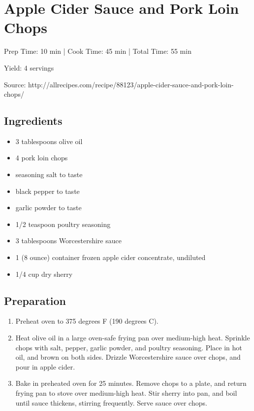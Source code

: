 \section{Apple Cider Sauce and Pork Loin Chops}

\begin{center}
Prep Time: 10 min |
Cook Time: 45 min |
Total Time: 55 min

\noindent Yield: 4 servings

\vspace{1em}

Source: http://allrecipes.com/recipe/88123/apple-cider-sauce-and-pork-loin-chops/
\end{center}

\subsection{Ingredients}
\begin{multicols}{2}
\begin{itemize}
    \item 3 tablespoons olive oil
    \item 4 pork loin chops
    \item seasoning salt to taste
    \item black pepper to taste
    \item garlic powder to taste
    \item 1/2 teaspoon poultry seasoning
    \item 3 tablespoons Worcestershire sauce
    \item 1 (8 ounce) container frozen apple cider concentrate, undiluted
    \item 1/4 cup dry sherry
\end{itemize}
\end{multicols}

\subsection{Preparation}
\begin{enumerate}
    \item Preheat oven to 375 degrees F (190 degrees C).
    \item Heat olive oil in a large oven-safe frying pan over medium-high heat. Sprinkle chops with salt, pepper, garlic powder, and poultry seasoning. Place in hot oil, and brown on both sides. Drizzle Worcestershire sauce over chops, and pour in apple cider.
    \item Bake in preheated oven for 25 minutes. Remove chops to a plate, and return frying pan to stove over medium-high heat. Stir sherry into pan, and boil until sauce thickens, stirring frequently. Serve sauce over chops.
\end{enumerate}

